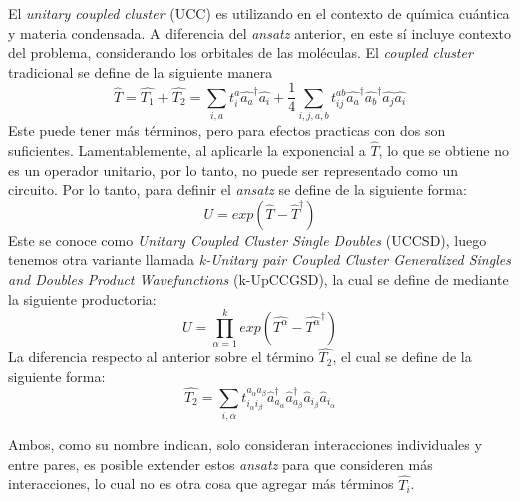El \textit{unitary coupled cluster} (UCC)\cite{doi:10.1021/acs.jctc.8b01004}\cite{Fedorov2022} es utilizando en el contexto de química cuántica y materia condensada. A diferencia del \textit{ansatz} anterior, en este sí incluye contexto del problema, considerando los orbitales de las moléculas. El \textit{coupled cluster} tradicional se define de la siguiente manera
\begin{equation*}
    \hat{T} = \hat{T_1} + \hat{T_2} = \sum_{i,a} t_i^a \hat{a_a}^{\dag} \hat{a_i} + \frac{1}{4}\sum_{i,j,a,b} t_{ij}^{ab} \hat{a_a}^{\dag} \hat{a_b}^{\dag} \hat{a_j}\hat{a_i}
\end{equation*}
Este puede tener más términos, pero para efectos practicas con dos son suficientes. Lamentablemente, al aplicarle la exponencial a $\hat{T}$, lo que se obtiene no es un operador unitario, por lo tanto, no puede ser representado como un circuito. Por lo tanto, para definir el \textit{ansatz} se define de la siguiente forma:
\begin{equation*}
    U = exp(\hat{T} - \hat{T}^{\dag})
\end{equation*}
Este se conoce como \textit{Unitary Coupled Cluster Single Doubles} (UCCSD), luego tenemos otra variante llamada \textit{k-Unitary pair Coupled Cluster Generalized Singles and Doubles Product Wavefunctions} (k-UpCCGSD), la cual se define de mediante la siguiente productoria:
\begin{equation*}
    U = \prod_{\alpha=1}^{k} exp(\hat{T^{\alpha}} - \hat{T^{\alpha}}^{\dag}) 
\end{equation*}
La diferencia respecto al anterior sobre el término $\hat{T_2}$, el cual se define de la siguiente forma:
\begin{equation*}
    \hat{T_2} = \sum_{i,\alpha} t_{i_{\alpha} i_{\beta}}^{a_{\alpha} a_{\beta}} \hat{a}^{\dag}_{a_{\alpha}} \hat{a}^{\dag}_{a_{\beta}} \hat{a}_{i_{\beta}} \hat{a}_{i_{\alpha}}
\end{equation*}

Ambos, como su nombre indican, solo consideran interacciones individuales y entre pares, es posible extender estos \textit{ansatz} para que consideren más interacciones, lo cual no es otra cosa que agregar más términos $\hat{T_i}$.

